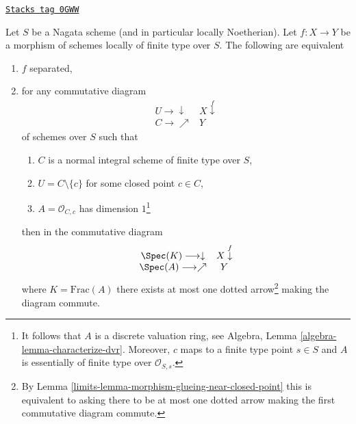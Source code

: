 \begin{lemma}
\label{limits-lemma-essentially-finite-type-criterion-separation}
\href{https://stacks.math.columbia.edu/tag/0GWW}{\texttt{Stacks tag 0GWW}}

Let $S$ be a Nagata scheme (and in particular locally Noetherian).
Let $f : X \to Y$ be a morphism of schemes locally of finite type over $S$.
The following are equivalent
\begin{enumerate}
\item $f$ separated,
\item for any commutative diagram
$$
\begin{array}{cc}U \longrightarrow\downarrow & X \overset{f}{\downarrow} \\ C \longrightarrow\nearrow & Y\end{array}
$$
of schemes over $S$ such that
\begin{enumerate}
\item $C$ is a normal integral scheme of finite type over $S$,
\item $U = C \setminus \{c\}$ for some closed point $c \in C$,
\item $A = \mathcal{O}_{C, c}$ has dimension $1$\footnote{It follows
that $A$ is a discrete valuation ring, see
Algebra, Lemma \ref{algebra-lemma-characterize-dvr}.
Moreover, $c$ maps to a finite type point $s \in S$ and
$A$ is essentially of finite type over $\mathcal{O}_{S, s}$.}
\end{enumerate}
then in the commutative diagram
$$
\begin{array}{cc}\Spec(K) \longrightarrow\downarrow & X \overset{f}{\downarrow} \\ \Spec(A) \longrightarrow\nearrow & Y\end{array}
$$
where $K = \text{Frac}(A)$ there exists at most one dotted arrow\footnote{By
Lemma \ref{limits-lemma-morphism-glueing-near-closed-point} this is
equivalent to asking there to be at most one dotted arrow
making the first commutative diagram commute.}
making the diagram commute.
\end{enumerate}
\end{lemma}

